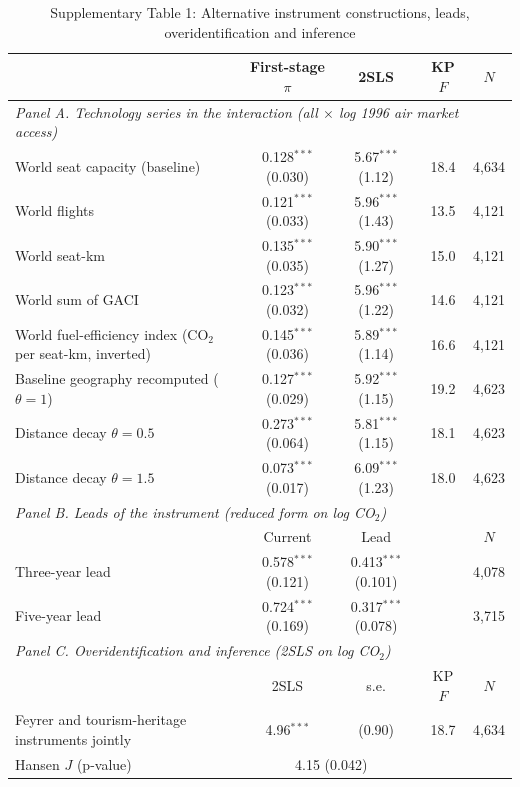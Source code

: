 \documentclass[12pt]{article}
\begin{document}
\begin{table}[htbp]
\centering
\begin{threeparttable}
\caption{Supplementary Table 1: Alternative instrument constructions, leads, overidentification and inference}
\label{tab:exclusion2}
\scriptsize
\begin{tabular}{lcccc}
\toprule
 & First-stage $\pi$ & 2SLS & KP $F$ & $N$ \\
\midrule
\multicolumn{5}{l}{\textit{Panel A. Technology series in the interaction (all $\times$ log 1996 air market access)}} \\
  World seat capacity (baseline) & 0.128$^{***}$ (0.030) & 5.67$^{***}$ (1.12) & 18.4 & 4,634 \\
  World flights & 0.121$^{***}$ (0.033) & 5.96$^{***}$ (1.43) & 13.5 & 4,121 \\
  World seat-km & 0.135$^{***}$ (0.035) & 5.90$^{***}$ (1.27) & 15.0 & 4,121 \\
  World sum of GACI & 0.123$^{***}$ (0.032) & 5.96$^{***}$ (1.22) & 14.6 & 4,121 \\
  World fuel-efficiency index (CO$_2$ per seat-km, inverted) & 0.145$^{***}$ (0.036) & 5.89$^{***}$ (1.14) & 16.6 & 4,121 \\
  Baseline geography recomputed ($\theta = 1$) & 0.127$^{***}$ (0.029) & 5.92$^{***}$ (1.15) & 19.2 & 4,623 \\
  Distance decay $\theta = 0.5$ & 0.273$^{***}$ (0.064) & 5.81$^{***}$ (1.15) & 18.1 & 4,623 \\
  Distance decay $\theta = 1.5$ & 0.073$^{***}$ (0.017) & 6.09$^{***}$ (1.23) & 18.0 & 4,623 \\
\midrule
\multicolumn{5}{l}{\textit{Panel B. Leads of the instrument (reduced form on log CO$_2$)}} \\
 & Current & Lead & & $N$ \\
  Three-year lead & 0.578$^{***}$ (0.121) & 0.413$^{***}$ (0.101) & & 4,078 \\
  Five-year lead & 0.724$^{***}$ (0.169) & 0.317$^{***}$ (0.078) & & 3,715 \\
\midrule
\multicolumn{5}{l}{\textit{Panel C. Overidentification and inference (2SLS on log CO$_2$)}} \\
 & 2SLS & s.e. & KP $F$ & $N$ \\
  Feyrer and tourism-heritage instruments jointly & 4.96$^{***}$ & (0.90) & 18.7 & 4,634 \\
  \quad Hansen $J$ (p-value) & \multicolumn{2}{c}{4.15 (0.042)} & & \\

\end{tabular}
\end{threeparttable}
\end{table}
\end{document}
